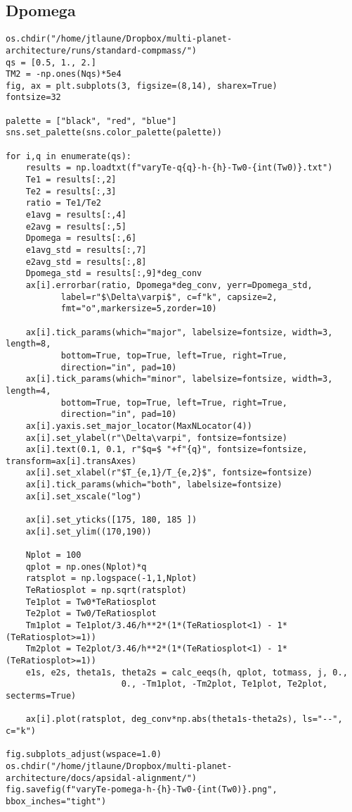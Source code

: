 \documentclass[11pt]{article}
\begin{document}
\subsection{Dpomega}
\label{sec:org0ac4710}
\begin{verbatim}
os.chdir("/home/jtlaune/Dropbox/multi-planet-architecture/runs/standard-compmass/")
qs = [0.5, 1., 2.]
TM2 = -np.ones(Nqs)*5e4
fig, ax = plt.subplots(3, figsize=(8,14), sharex=True)
fontsize=32

palette = ["black", "red", "blue"]
sns.set_palette(sns.color_palette(palette))

for i,q in enumerate(qs):
    results = np.loadtxt(f"varyTe-q{q}-h-{h}-Tw0-{int(Tw0)}.txt")
    Te1 = results[:,2]
    Te2 = results[:,3]
    ratio = Te1/Te2
    e1avg = results[:,4]
    e2avg = results[:,5]
    Dpomega = results[:,6]
    e1avg_std = results[:,7]
    e2avg_std = results[:,8]
    Dpomega_std = results[:,9]*deg_conv
    ax[i].errorbar(ratio, Dpomega*deg_conv, yerr=Dpomega_std,
		   label=r"$\Delta\varpi$", c=f"k", capsize=2,
		   fmt="o",markersize=5,zorder=10)

    ax[i].tick_params(which="major", labelsize=fontsize, width=3, length=8,
		   bottom=True, top=True, left=True, right=True,
		   direction="in", pad=10)
    ax[i].tick_params(which="minor", labelsize=fontsize, width=3, length=4,
		   bottom=True, top=True, left=True, right=True,
		   direction="in", pad=10)
    ax[i].yaxis.set_major_locator(MaxNLocator(4))
    ax[i].set_ylabel(r"\Delta\varpi", fontsize=fontsize)
    ax[i].text(0.1, 0.1, r"$q=$ "+f"{q}", fontsize=fontsize, transform=ax[i].transAxes)
    ax[i].set_xlabel(r"$T_{e,1}/T_{e,2}$", fontsize=fontsize)
    ax[i].tick_params(which="both", labelsize=fontsize)
    ax[i].set_xscale("log")

    ax[i].set_yticks([175, 180, 185 ])
    ax[i].set_ylim((170,190))

    Nplot = 100
    qplot = np.ones(Nplot)*q
    ratsplot = np.logspace(-1,1,Nplot)
    TeRatiosplot = np.sqrt(ratsplot)
    Te1plot = Tw0*TeRatiosplot
    Te2plot = Tw0/TeRatiosplot
    Tm1plot = Te1plot/3.46/h**2*(1*(TeRatiosplot<1) - 1*(TeRatiosplot>=1))
    Tm2plot = Te2plot/3.46/h**2*(1*(TeRatiosplot<1) - 1*(TeRatiosplot>=1))
    e1s, e2s, theta1s, theta2s = calc_eeqs(h, qplot, totmass, j, 0.,
					   0., -Tm1plot, -Tm2plot, Te1plot, Te2plot, secterms=True)

    ax[i].plot(ratsplot, deg_conv*np.abs(theta1s-theta2s), ls="--", c="k")

fig.subplots_adjust(wspace=1.0)
os.chdir("/home/jtlaune/Dropbox/multi-planet-architecture/docs/apsidal-alignment/")
fig.savefig(f"varyTe-pomega-h-{h}-Tw0-{int(Tw0)}.png", bbox_inches="tight")
\end{verbatim}
\end{document}
